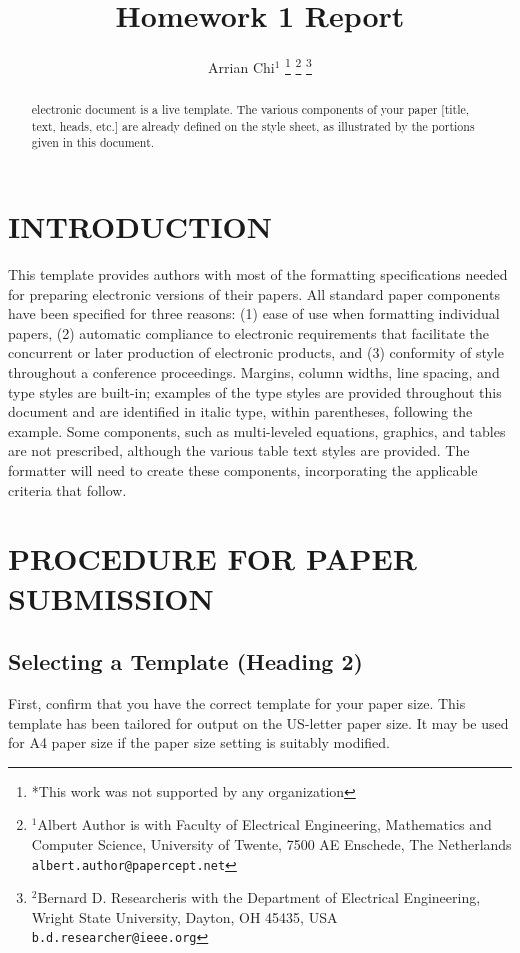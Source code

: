\documentclass[letterpaper, 10 pt, conference]{ieeeconf}  %
\title{\LARGE \bf
Homework 1 Report
}
\author{Arrian Chi$^{1}$%
\thanks{*This work was not supported by any organization}%
\thanks{$^{1}$Albert Author is with Faculty of Electrical Engineering, Mathematics and Computer Science,
        University of Twente, 7500 AE Enschede, The Netherlands
        {\tt\small albert.author@papercept.net}}%
\thanks{$^{2}$Bernard D. Researcheris with the Department of Electrical Engineering, Wright State University,
        Dayton, OH 45435, USA
        {\tt\small b.d.researcher@ieee.org}}%
}
\begin{document}
\maketitle
\thispagestyle{empty}
\pagestyle{empty}


\begin{abstract}

electronic document is a live template. The various components of your paper [title, text, heads, etc.] are already defined on the style sheet, as illustrated by the portions given in this document.

\end{abstract}


\section{INTRODUCTION}

This template provides authors with most of the formatting specifications needed for preparing electronic versions of their papers. All standard paper components have been specified for three reasons: (1) ease of use when formatting individual papers, (2) automatic compliance to electronic requirements that facilitate the concurrent or later production of electronic products, and (3) conformity of style throughout a conference proceedings. Margins, column widths, line spacing, and type styles are built-in; examples of the type styles are provided throughout this document and are identified in italic type, within parentheses, following the example. Some components, such as multi-leveled equations, graphics, and tables are not prescribed, although the various table text styles are provided. The formatter will need to create these components, incorporating the applicable criteria that follow.

\section{PROCEDURE FOR PAPER SUBMISSION}

\subsection{Selecting a Template (Heading 2)}

First, confirm that you have the correct template for your paper size. This template has been tailored for output on the US-letter paper size.
It may be used for A4 paper size if the paper size setting is suitably modified.
\end{document}
